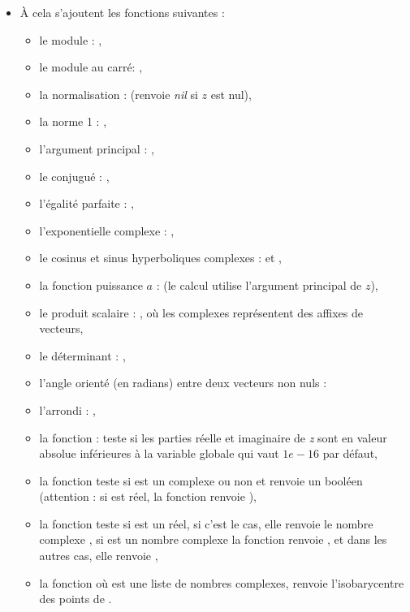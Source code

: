 \begin{itemize}
    \item À cela s'ajoutent les fonctions suivantes :
  \begin{itemize}
  \item le module : ,
  \item le module au carré: ,
  \item la normalisation :  (renvoie \emph{nil} si $z$ est nul),
  \item la norme 1 : ,
  \item l'argument principal : ,
  \item le conjugué : ,
  \item l'égalité parfaite : ,
  \item l'exponentielle complexe : ,
  \item le cosinus et sinus hyperboliques complexes :  et ,
  \item la fonction puissance $a$ :  (le calcul utilise l'argument principal de $z$),
  \item le produit scalaire : , où les complexes représentent des affixes de vecteurs,
  \item le déterminant : ,
  \item l'angle orienté (en radians) entre deux vecteurs non nuls : 
  \item l'arrondi : ,
  \item la fonction :  teste si les parties réelle et imaginaire de \emph{z} sont en valeur absolue inférieures à la variable globale  qui vaut $1e-16$ par défaut,
  \item la fonction  teste si  est un complexe ou non et renvoie un booléen (attention : si  est réel, la fonction renvoie \false),
  \item la fonction  teste si  est un réel, si c'est le cas, elle renvoie le nombre complexe , si  est un nombre complexe la fonction renvoie , et dans les autres cas, elle renvoie \nil,
  \item la fonction  où  est une liste de nombres complexes, renvoie l'isobarycentre des points de .
  \end{itemize}
\end{itemize}

